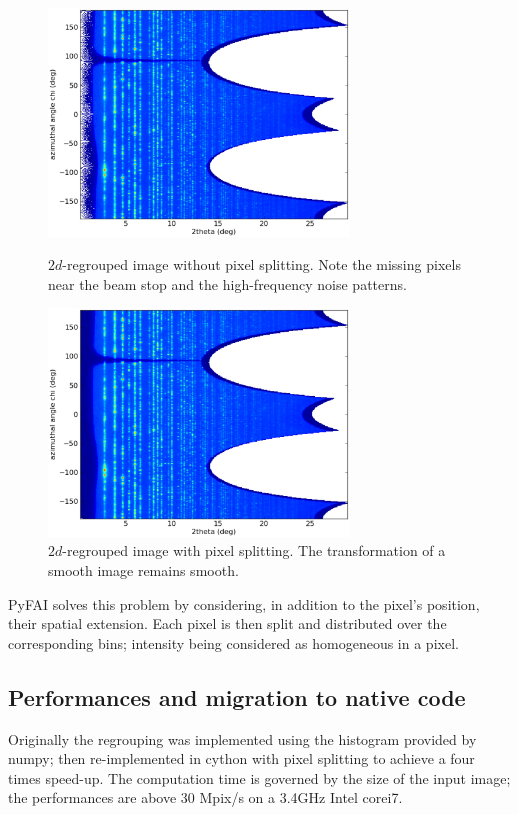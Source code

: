 \documentclass[a4paper]{jpconf}
\begin{document}
\begin{figure}[h]
\begin{minipage}{8cm}
\includegraphics[width=8cm]{img/2Dhistogram.eps}
\caption{\label{rough}$2d$-regrouped image without pixel splitting. Note
the missing pixels near the beam stop and the high-frequency noise patterns.}
\end{minipage}\hspace{5mm}
\begin{minipage}{8cm}
\includegraphics[width=8cm]{img/2DwithSplit.eps}
\caption{\label{smooth}$2d$-regrouped image with pixel splitting. The
transformation of a smooth image remains smooth.}
\end{minipage}
\end{figure}

PyFAI solves this problem by considering, in addition to the pixel's position,
their spatial extension. Each pixel is then split and distributed over the
corresponding bins; intensity being considered as homogeneous in a pixel.

\subsection{Performances and migration to native code}
Originally the regrouping was implemented
using the histogram provided by numpy\cite{numpy}; then re-implemented in
cython\cite{cython} with pixel splitting to achieve a four times speed-up.
The computation time is governed by the size of the input image; the performances 
are above 30 Mpix/s on a 3.4GHz Intel corei7.
\end{document}

